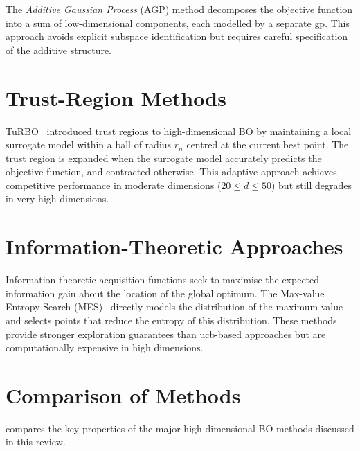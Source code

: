 The \emph{Additive Gaussian Process} (AGP) method decomposes the objective
function into a sum of low-dimensional components, each modelled by a separate
\gls{gp}.  This approach avoids explicit subspace identification but requires
careful specification of the additive structure.

\section{Trust-Region Methods}
\label{sec:trust-region}

TuRBO~\cite{einstein1905} introduced trust regions to high-dimensional BO by
maintaining a local surrogate model within a ball of radius $r_n$ centred at
the current best point.  The trust region is expanded when the surrogate model
accurately predicts the objective function, and contracted otherwise.  This
adaptive approach achieves competitive performance in moderate dimensions
($20 \leq d \leq 50$) but still degrades in very high dimensions.

\section{Information-Theoretic Approaches}
\label{sec:info-theoretic}

Information-theoretic acquisition functions seek to maximise the expected
information gain about the location of the global optimum.  The
Max-value Entropy Search (MES)~\cite{goossensLaTeXCompanion1993} directly
models the distribution of the maximum value and selects points that reduce
the entropy of this distribution.  These methods provide stronger exploration
guarantees than \gls{ucb}-based approaches but are computationally expensive
in high dimensions.

\section{Comparison of Methods}
\label{sec:comparison}

 compares the key properties of the major
high-dimensional BO methods discussed in this review.

